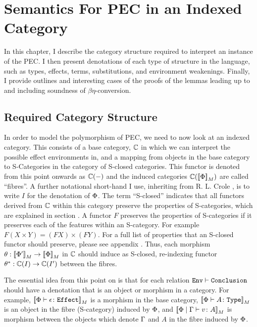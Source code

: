\documentclass{Report}
\begin{document}

\chapter{Semantics For PEC in an Indexed Category}


In this chapter, I  describe the category structure required to interpret an instance of the PEC. I then present denotations of each type of structure in the language, such as types, effects, terms, substitutions, and environment weakenings. Finally, I provide outlines and interesting cases of the proofs of the lemmas leading up to and including soundness of $\beta\eta$-conversion. 


\section{Required Category Structure}
In order to model the polymorphism of PEC, we need to now look at an indexed category. This consists of a base category, $\C$ in which we can interpret the possible effect environments in, and a mapping from objects in the base category to S-Categories in the category of S-closed categories. This functor is denoted from this point onwards as $\C(-)$ and the induced categories $\C(\deno{\P})$ are called ``fibres''. A further notational short-hand I use, inheriting from R. L. Crole , is to write $I$ for the denotation of $\P$. The term ``S-closed'' indicates that all functors derived from $\C$ within this category preserve the properties of S-categories, which are explained in section . A functor $F$ preserves the properties of S-categories if it preserves each of the features within an S-category. For example $F(X\times Y) = (FX)\times (FY)$. For a full list of properties that an S-closed functor should preserve, please see appendix . Thus, each morphism $\theta: \deno{\P'}\rightarrow\deno{\P}$ in $\C$ should induce as S-closed, re-indexing functor $\theta\star: \C(I)\rightarrow\C(I')$ between the fibres.

The essential idea from this point on is that for each relation  $\wellformed{\texttt{Env}}{\texttt{Conclusion}}$ should have a denotation that is an object or morphism in a category. For example, $\deno{\typerelation{\P}{\e}{\effect}}$ is a morphism in the base category, $\deno{\typerelation{\P}{A}{\type}}$ is an object in the fibre (S-category) induced by $\P$, and $\deno{\gpetyperelation{v}{A}}$ is morphism between the objects which denote $\G$ and $A$ in the fibre induced by $\P$.
\end{document}
